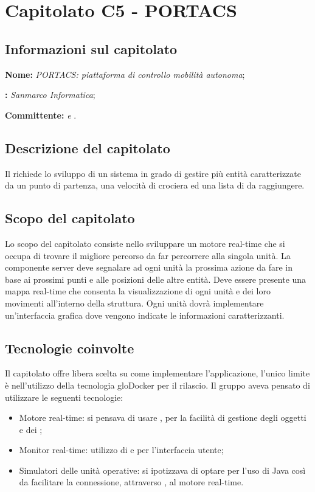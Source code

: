 \section{Capitolato C5 - PORTACS}\label{C5}
\subsection{Informazioni sul capitolato}
\begin{description}
	\item \textbf{Nome:} \textit{PORTACS: piattaforma di controllo mobilità autonoma};
	\item \textbf{:} \textit{Sanmarco Informatica};
	\item \textbf{Committente:} \textit{\VT{} e \CR{}}.
\end{description}

\subsection{Descrizione del capitolato}
Il  richiede lo sviluppo di un sistema  in grado di gestire più entità caratterizzate da un punto di partenza, una velocità di crociera ed una lista di  da raggiungere.

\subsection{Scopo del capitolato}
Lo scopo del capitolato consiste nello sviluppare un motore real-time che si occupa di trovare il migliore percorso da far percorrere alla singola unità.
La componente server deve segnalare ad ogni unità la prossima azione da fare in base ai prossimi punti e alle posizioni delle altre entità. Deve essere presente una mappa real-time che consenta la visualizzazione di ogni unità e dei loro movimenti all'interno della struttura.
Ogni unità dovrà implementare un'interfaccia grafica dove vengono indicate le informazioni caratterizzanti.

\subsection{Tecnologie coinvolte}
Il capitolato offre libera scelta su come implementare l'applicazione, l'unico limite è nell'utilizzo della tecnologia glo{Docker} per il rilascio. Il gruppo aveva pensato di utilizzare le seguenti tecnologie:
\begin{itemize}
	\item Motore real-time: si pensava di usare , per la facilità di gestione degli oggetti e dei ;
	\item Monitor real-time: utilizzo di  e  per l'interfaccia utente;
	\item Simulatori delle unità operative: si ipotizzava di optare per l'uso di Java così da facilitare la connessione, attraverso , al motore real-time.
\end{itemize}

